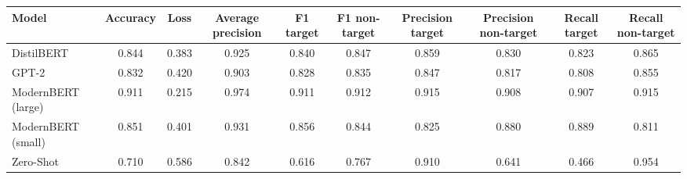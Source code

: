 \begin{tabular}{lccccccccc}
\toprule
\textbf{Model} & \textbf{Accuracy} & \textbf{Loss} & \textbf{Average precision} & \textbf{F1 target} & \textbf{F1 non-target} & \textbf{Precision target} & \textbf{Precision non-target} & \textbf{Recall target} & \textbf{Recall non-target}  \\
\midrule
DistilBERT & 0.844 & 0.383 & 0.925 & 0.840 & 0.847 & 0.859 & 0.830 & 0.823 & 0.865 \\
GPT-2 & 0.832 & 0.420 & 0.903 & 0.828 & 0.835 & 0.847 & 0.817 & 0.808 & 0.855 \\
ModernBERT (large) & 0.911 & 0.215 & 0.974 & 0.911 & 0.912 & 0.915 & 0.908 & 0.907 & 0.915 \\
ModernBERT (small) & 0.851 & 0.401 & 0.931 & 0.856 & 0.844 & 0.825 & 0.880 & 0.889 & 0.811 \\
Zero-Shot & 0.710 & 0.586 & 0.842 & 0.616 & 0.767 & 0.910 & 0.641 & 0.466 & 0.954 \\
\bottomrule
\end{tabular}
